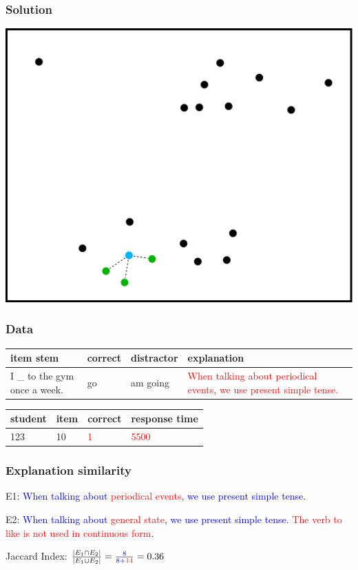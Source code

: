 \documentclass[bigger, aspectratio=169]{beamer}
\begin{document}
\begin{frame}
	\frametitle{Solution}
	\begin{center}
		\includegraphics[width=0.65\linewidth]{figures/similarity_visualization_recommendation}
	\end{center}
\end{frame}


\begin{frame}
	\frametitle{Data}
	\centering
	\footnotesize
	
	\begin{tabular}{p{.28\linewidth}llp{.43\linewidth}}
		\toprule
		item stem & correct & distractor & explanation \\
		\midrule
		I \_ to the gym once a week. & go & am going & \textcolor{red}{When talking about
		periodical events, we use present simple tense.} \\
		\bottomrule
	\end{tabular}

	\bigskip
	
	\begin{tabular}{llll}
		\toprule
		student & item & correct & response time \\
		\midrule
		123 & 10 & \textcolor{red}{1} & \textcolor{red}{5500} \\
		\bottomrule
	\end{tabular}
	
\end{frame}

\begin{frame}
	\frametitle{Explanation similarity}
	E1: \textcolor{blue}{When talking about} \textcolor{red}{periodical events}, \textcolor{blue}{we use 
	present simple tense}.
	
	E2: \textcolor{blue}{When talking about} \textcolor{red}{general state}, \textcolor{blue}{we use 
	present simple tense}. \textcolor{red}{The verb to like is 	not used in continuous form}.

	Jaccard Index: $ \frac{|E_1 \cap E_2|}{|E_1 \cup E_2|} = \frac{\color{blue} 8}{\color{blue} 8 + \color{red} 
	14 } = 0.36$
	
\end{frame}
\end{document}
